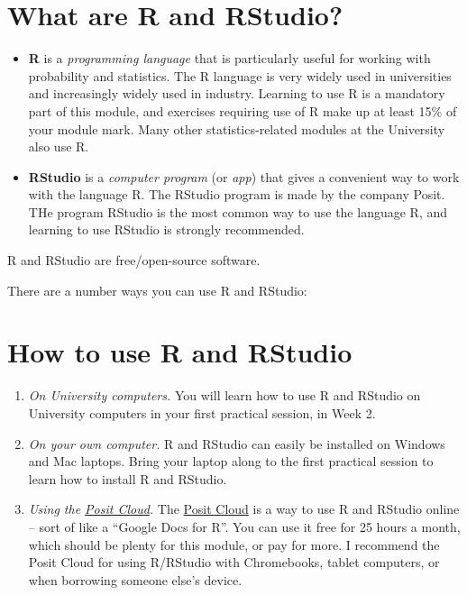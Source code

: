 \documentclass[
  a4paper,
]{book}
\providecommand{\tightlist}{%
  \setlength{\itemsep}{0pt}\setlength{\parskip}{0pt}}
\theoremstyle{definition}
\theoremstyle{definition}
\theoremstyle{definition}
\theoremstyle{definition}
\theoremstyle{remark}
\begin{document}
\hypertarget{what-is-r}{%
\section*{What are R and RStudio?}\label{what-is-r}}

\begin{itemize}
\tightlist
\item
  \textbf{R} is a \emph{programming language} that is particularly useful for working with probability and statistics. The R language is very widely used in universities and increasingly widely used in industry. Learning to use R is a mandatory part of this module, and exercises requiring use of R make up at least 15\% of your module mark. Many other statistics-related modules at the University also use R.
\item
  \textbf{RStudio} is a \emph{computer program} (or \emph{app}) that gives a convenient way to work with the language R. The RStudio program is made by the company Posit. THe program RStudio is the most common way to use the language R, and learning to use RStudio is strongly recommended.
\end{itemize}

R and RStudio are free/open-source software.

There are a number ways you can use R and RStudio:

\hypertarget{how-to-use-r-and-rstudio}{%
\section*{How to use R and RStudio}\label{how-to-use-r-and-rstudio}}

\begin{enumerate}
\def\labelenumi{\arabic{enumi}.}
\item
  \emph{On University computers.} You will learn how to use R and RStudio on University computers in your first practical session, in Week 2.
\item
  \emph{On your own computer.} R and RStudio can easily be installed on Windows and Mac laptops. Bring your laptop along to the first practical session to learn how to install R and RStudio.
\item
  \emph{Using the \href{https://posit.cloud}{Posit Cloud}.} The \href{https://posit.cloud}{Posit Cloud} is a way to use R and RStudio online -- sort of like a ``Google Docs for R''. You can use it free for 25 hours a month, which should be plenty for this module, or pay for more. I recommend the Posit Cloud for using R/RStudio with Chromebooks, tablet computers, or when borrowing someone else's device.
\end{enumerate}
\end{document}
